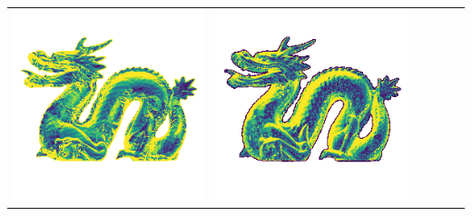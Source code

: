 \begin{tabularx}{\linewidth}{@{}Y@{}Y@{}Y@{}Y@{}Y@{}Y@{}}
\includegraphics[width=\linewidth]{semisynthetic/20160617_21_yu_err.png} &
\includegraphics[width=\linewidth]{semisynthetic/20160617_21_dpsn_err.png} &

\end{tabularx}
